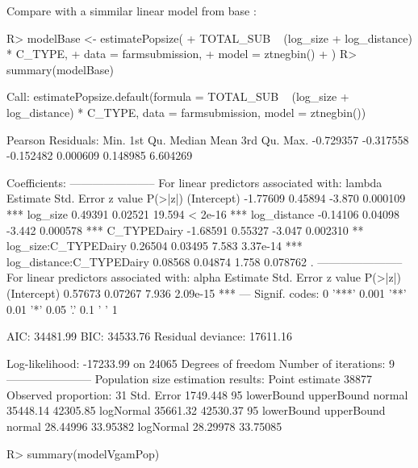 \documentclass[
]{jss}
\newcommand{\1}{\mathcal{I}} \newcommand{\bZero}{\boldsymbol{0}}
\begin{document}
Compare with a simmilar linear model from base :
\small

\begin{CodeChunk}
\begin{CodeInput}
R> modelBase <- estimatePopsize(
+   TOTAL_SUB ~ (log_size + log_distance) * C_TYPE,
+   data = farmsubmission,
+   model = ztnegbin()
+ )
R> summary(modelBase)
\end{CodeInput}
\begin{CodeOutput}

Call:
estimatePopsize.default(formula = TOTAL_SUB ~ (log_size + log_distance) * 
    C_TYPE, data = farmsubmission, model = ztnegbin())

Pearson Residuals:
     Min.   1st Qu.    Median      Mean   3rd Qu.      Max. 
-0.729357 -0.317558 -0.152482  0.000609  0.148985  6.604269 

Coefficients:
-----------------------
For linear predictors associated with: lambda 
                         Estimate Std. Error z value  P(>|z|)    
(Intercept)              -1.77609    0.45894  -3.870 0.000109 ***
log_size                  0.49391    0.02521  19.594  < 2e-16 ***
log_distance             -0.14106    0.04098  -3.442 0.000578 ***
C_TYPEDairy              -1.68591    0.55327  -3.047 0.002310 ** 
log_size:C_TYPEDairy      0.26504    0.03495   7.583 3.37e-14 ***
log_distance:C_TYPEDairy  0.08568    0.04874   1.758 0.078762 .  
-----------------------
For linear predictors associated with: alpha 
            Estimate Std. Error z value  P(>|z|)    
(Intercept)  0.57673    0.07267   7.936 2.09e-15 ***
---
Signif. codes:  0 '***' 0.001 '**' 0.01 '*' 0.05 '.' 0.1 ' ' 1

AIC: 34481.99
BIC: 34533.76
Residual deviance: 17611.16

Log-likelihood: -17233.99 on 24065 Degrees of freedom 
Number of iterations: 9
-----------------------
Population size estimation results: 
Point estimate 38877
Observed proportion: 31%
Std. Error 1749.448
95%
          lowerBound upperBound
normal      35448.14   42305.85
logNormal   35661.32   42530.37
95%
          lowerBound upperBound
normal      28.44996   33.95382
logNormal   28.29978   33.75085
\end{CodeOutput}
\begin{CodeInput}
R> summary(modelVgamPop)
\end{CodeInput}
\begin{CodeOutput}


\end{CodeOutput}
\end{CodeChunk}
\end{document}
